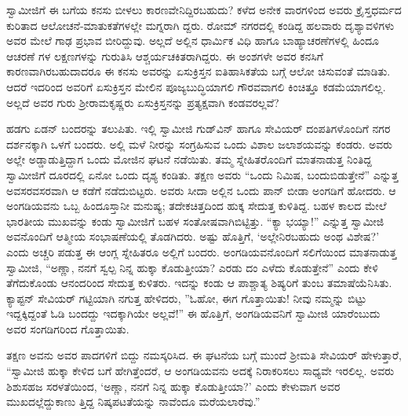 ಸ್ವಾಮೀಜಿಗೆ ಈ ಬಗೆಯ ಕನಸು ಬೀಳಲು ಕಾರಣವೇನಿದ್ದಿರಬಹುದು? ಕಳೆದ ಅನೇಕ ವಾರಗಳಿಂದ ಅವರು ಕ್ರೈಸ್ತಧರ್ಮದ ಕುರಿತಾದ ಆಲೋಚನೆ-ಮಾತುಕತೆಗಳಲ್ಲೇ ಮಗ್ನರಾಗಿ ದ್ದರು. ರೋಮ್ ನಗರದಲ್ಲಿ ಕಂಡಿದ್ದ ಹಲವಾರು ದೃಶ್ಯಾವಳಿಗಳು ಅವರ ಮೇಲೆ ಗಾಢ ಪ್ರಭಾವ ಬೀರಿದ್ದುವು. ಅಲ್ಲದೆ ಅಲ್ಲಿನ ಧಾರ್ಮಿಕ ವಿಧಿ ಹಾಗೂ ಬಾಹ್ಯಾಚರಣೆಗಳಲ್ಲಿ ಹಿಂದೂ ಆಚರಣೆ ಗಳ ಲಕ್ಷಣಗಳನ್ನು ಗುರುತಿಸಿ ಆಶ್ಚರ್ಯಚಕಿತರಾಗಿದ್ದರು. ಈ ಅಂಶಗಳೇ ಅವರ ಕನಸಿಗೆ ಕಾರಣವಾಗಿರಬಹುದಾದರೂ ಈ ಕನಸು ಅವರನ್ನು ಏಸುಕ್ರಿಸ್ತನ ಐತಿಹಾಸಿಕತೆಯ ಬಗ್ಗೆ ಆಲೋ ಚಿಸುವಂತೆ ಮಾಡಿತು. ಆದರೆ ಇದರಿಂದ ಅವರಿಗೆ ಏಸುಕ್ರಿಸ್ತನ ಮೇಲಿನ ಪೂಜ್ಯಬುದ್ಧಿಯಾಗಲಿ ಗೌರವವಾಗಲಿ ಕಿಂಚಿತ್ತೂ ಕಡಮೆಯಾಗಲಿಲ್ಲ. ಅಲ್ಲದೆ ಅವರ ಗುರು ಶ್ರೀರಾಮಕೃಷ್ಣರು ಏಸುಕ್ರಿಸ್ತನನ್ನು ಪ್ರತ್ಯಕ್ಷವಾಗಿ ಕಂಡವರಲ್ಲವೆ?

ಹಡಗು ಏಡನ್ ಬಂದರನ್ನು ತಲುಪಿತು. ಇಲ್ಲಿ ಸ್ವಾಮೀಜಿ ಗುಡ್​ವಿನ್ ಹಾಗೂ ಸೇವಿಯರ್ ದಂಪತಿಗಳೊಂದಿಗೆ ನಗರ ದರ್ಶನಕ್ಕಾಗಿ ಒಳಗೆ ಬಂದರು. ಅಲ್ಲಿ ಮಳೆ ನೀರನ್ನು ಸಂಗ್ರಹಿಸುವ ಒಂದು ವಿಶಾಲ ಜಲಾಶಯವನ್ನು ಕಂಡರು. ಅವರು ಅಲ್ಲೇ ಅಡ್ಡಾಡುತ್ತಿದ್ದಾಗ ಒಂದು ಮೋಜಿನ ಘಟನೆ ನಡೆಯಿತು. ತಮ್ಮ ಸ್ನೇಹಿತರೊಂದಿಗೆ ಮಾತನಾಡುತ್ತ ನಿಂತಿದ್ದ ಸ್ವಾಮೀಜಿಗೆ ದೂರದಲ್ಲಿ ಏನೋ ಒಂದು ದೃಶ್ಯ ಕಂಡಿತು. ತಕ್ಷಣ ಅವರು “ಒಂದು ನಿಮಿಷ, ಬಂದುಬಿಡುತ್ತೇನೆ” ಎನ್ನುತ್ತ ಅವಸರವಸರವಾಗಿ ಆ ಕಡೆಗೆ ನಡೆದುಬಿಟ್ಟರು. ಅವರು ಸೀದಾ ಅಲ್ಲಿನ ಒಂದು ಪಾನ್ ಬೀಡಾ ಅಂಗಡಿಗೆ ಹೋದರು. ಆ ಅಂಗಡಿಯವನು ಒಬ್ಬ ಹಿಂದೂಸ್ತಾನೀ ಮನುಷ್ಯ; ತದೇಕಚಿತ್ತದಿಂದ ಹುಕ್ಕ ಸೇದುತ್ತ ಕುಳಿತಿದ್ದ. ಬಹಳ ಕಾಲದ ಮೇಲೆ ಭಾರತೀಯ ಮುಖವನ್ನು ಕಂಡು ಸ್ವಾಮೀಜಿಗೆ ಬಹಳ ಸಂತೋಷವಾಗಿಬಿಟ್ಟಿತ್ತು. “ಕ್ಯಾ ಭಯ್ಯಾ!” ಎನ್ನುತ್ತ ಸ್ವಾಮೀಜಿ ಅವನೊಂದಿಗೆ ಆತ್ಮೀಯ ಸಂಭಾಷಣೆಯಲ್ಲಿ ತೊಡಗಿದರು. ಅಷ್ಟು ಹೊತ್ತಿಗೆ, ‘ಅಲ್ಲೇನಿರಬಹುದು ಅಂಥ ವಿಶೇಷ?’ ಎಂದು ಅಚ್ಚರಿ ಪಡುತ್ತ ಈ ಆಂಗ್ಲ ಸ್ನೇಹಿತರೂ ಅಲ್ಲಿಗೆ ಬಂದರು. ಅಂಗಡಿಯವನೊಂದಿಗೆ ಸಲಿಗೆಯಿಂದ ಮಾತನಾಡುತ್ತ ಸ್ವಾಮೀಜಿ, “ಅಣ್ಣಾ, ನನಗೆ ಸ್ವಲ್ಪ ನಿನ್ನ ಹುಕ್ಕಾ ಕೊಡುತ್ತೀಯಾ? ಎರಡು ದಂ ಎಳೆದು ಕೊಡುತ್ತೇನೆ” ಎಂದು ಕೇಳಿ ತೆಗೆದುಕೊಂಡು ಆನಂದರಿಂದ ಸೇದುತ್ತ ಕುಳಿತರು. ಇದನ್ನು ಕಂಡು ಆ ಪಾಶ್ಚಾತ್ಯ ಶಿಷ್ಯರಿಗೆ ತುಂಬ ತಮಾಷೆಯೆನಿಸಿತು. ಕ್ಯಾಪ್ಟನ್ ಸೇವಿಯರ್ ಗಟ್ಟಿಯಾಗಿ ನಗುತ್ತ ಹೇಳಿದರು, ”ಓಹೋ, ಈಗ ಗೊತ್ತಾಯಿತು! ನೀವು ನಮ್ಮನ್ನು ಬಿಟ್ಟು ಇದ್ದಕ್ಕಿದ್ದಂತೆ ಓಡಿ ಬಂದದ್ದು ಇದಕ್ಕಾಗಿಯೇ ಅಲ್ಲವೆ!” ಈ ಹೊತ್ತಿಗೆ, ಅಂಗಡಿಯವನಿಗೆ ಸ್ವಾಮೀಜಿ ಯಾರೆಂಬುದು ಅವರ ಸಂಗಡಿಗರಿಂದ ಗೊತ್ತಾಯಿತು.

ತಕ್ಷಣ ಅವನು ಅವರ ಪಾದಗಳಿಗೆ ಬಿದ್ದು ನಮಸ್ಕರಿಸಿದ. ಈ ಘಟನೆಯ ಬಗ್ಗೆ ಮುಂದೆ ಶ್ರೀಮತಿ ಸೇವಿಯರ್ ಹೇಳುತ್ತಾರೆ, “ಸ್ವಾಮೀಜಿ ಹುಕ್ಕಾ ಕೇಳಿದ ಬಗೆ ಹೇಗಿತ್ತೆಂದರೆ, ಆ ಅಂಗಡಿಯವನು ಅದಕ್ಕೆ ನಿರಾಕರಿಸಲು ಸಾಧ್ಯವೇ ಇರಲಿಲ್ಲ. ಅವರು ಶಿಶುಸಹಜ ಸರಳತೆಯಿಂದ, ‘ಅಣ್ಣಾ, ನನಗೆ ನಿನ್ನ ಹುಕ್ಕಾ ಕೊಡುತ್ತೀಯಾ?’ ಎಂದು ಕೇಳುವಾಗ ಅವರ ಮುಖದಲ್ಲೆದ್ದುಕಾಣು ತ್ತಿದ್ದ ನಿಷ್ಕಪಟತೆಯನ್ನು ನಾವೆಂದೂ ಮರೆಯಲಾರೆವು.”

